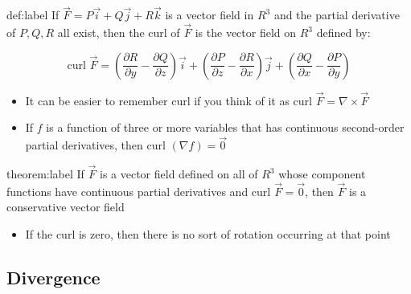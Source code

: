 \documentclass{package/notes}
\begin{document}
\begin{definition}[Curl]{def:label}
	If $\vec F = P\vec i + Q\vec j + R\vec k$ is a vector field in $R^3$ and the partial derivative of $P, Q, R$ all exist, then the curl of $\vec F$ is the vector field on $R^3$ defined by:
	
	$$\text{curl } \vec F = \left(\frac{\partial R}{\partial y}- \frac{\partial Q}{\partial z}\right)\vec i + \left(\frac{\partial P}{\partial z}- \frac{\partial R}{\partial x}\right)\vec j + \left(\frac{\partial Q}{\partial x}- \frac{\partial P}{\partial y}\right)$$
\end{definition}

\begin{itemize}
	\item It can be easier to remember curl if you think of it as $\text{curl } \vec F = \nabla \times \vec F$
	\item If $f$ is a function of three or more variables that has continuous second-order partial derivatives, then $\text{curl }(\nabla f) = \vec 0$ 
\end{itemize}

\begin{theorem}{theorem:label}
	If $\vec F$ is a vector field defined on all of $R^3$ whose component functions have continuous partial derivatives and $\text{curl } \vec F = \vec 0$, then $\vec F$ is a conservative vector field
\end{theorem}

\begin{itemize}
	\item If the curl is zero, then there is no sort of rotation occurring at that point
\end{itemize}


\subsection{Divergence}
\end{document}
